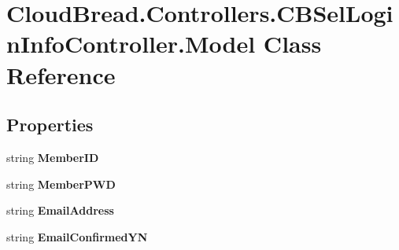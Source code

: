 \hypertarget{class_cloud_bread_1_1_controllers_1_1_c_b_sel_login_info_controller_1_1_model}{}\section{Cloud\+Bread.\+Controllers.\+C\+B\+Sel\+Login\+Info\+Controller.\+Model Class Reference}
\label{class_cloud_bread_1_1_controllers_1_1_c_b_sel_login_info_controller_1_1_model}
\subsection*{Properties}
\begin{DoxyCompactItemize}
\item 
string {\bfseries Member\+ID}\hypertarget{class_cloud_bread_1_1_controllers_1_1_c_b_sel_login_info_controller_1_1_model_a7744dfc5bc4b1ae4889076e6ebf6ca07}{}\label{class_cloud_bread_1_1_controllers_1_1_c_b_sel_login_info_controller_1_1_model_a7744dfc5bc4b1ae4889076e6ebf6ca07}

\item 
string {\bfseries Member\+P\+WD}\hypertarget{class_cloud_bread_1_1_controllers_1_1_c_b_sel_login_info_controller_1_1_model_ad2269bb564a85491d0b3946299a38567}{}\label{class_cloud_bread_1_1_controllers_1_1_c_b_sel_login_info_controller_1_1_model_ad2269bb564a85491d0b3946299a38567}

\item 
string {\bfseries Email\+Address}\hypertarget{class_cloud_bread_1_1_controllers_1_1_c_b_sel_login_info_controller_1_1_model_a028c37ec277c76b747489025ee15fdf2}{}\label{class_cloud_bread_1_1_controllers_1_1_c_b_sel_login_info_controller_1_1_model_a028c37ec277c76b747489025ee15fdf2}

\item 
string {\bfseries Email\+Confirmed\+YN}\hypertarget{class_cloud_bread_1_1_controllers_1_1_c_b_sel_login_info_controller_1_1_model_a09151ce2c59e8d045990775761baad20}{}\label{class_cloud_bread_1_1_controllers_1_1_c_b_sel_login_info_controller_1_1_model_a09151ce2c59e8d045990775761baad20}


\end{DoxyCompactItemize}
